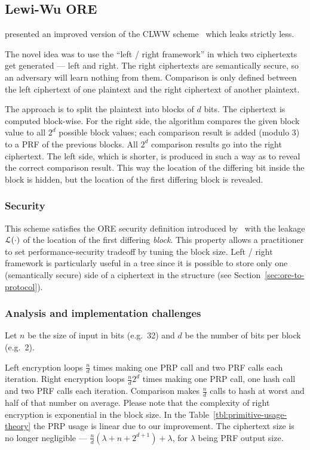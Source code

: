 \subsection{Lewi-Wu ORE}

	\textcite{lewi-wu-ore} presented an improved version of the CLWW scheme~\cite{clww-ore} which leaks strictly less.

	The novel idea was to use the ``left / right framework'' in which two ciphertexts get generated --- left and right.
	The right ciphertexts are semantically secure, so an adversary will learn nothing from them.
	Comparison is only defined between the left ciphertext of one plaintext and the right ciphertext of another plaintext.

	The approach is to split the plaintext into blocks of $d$ bits.
	The ciphertext is computed block-wise.
	For the right side, the algorithm compares the given block value to all $2^d$ possible block values; each comparison result is added (modulo 3) to a PRF of the previous blocks.
	All $2^d$ comparison results go into the right ciphertext.
	The left side, which is shorter, is produced in such a way as to reveal the correct comparison result.
	This way the location of the differing bit inside the block is hidden, but the location of the first differing block is revealed.

	\subsubsection{Security}
		This scheme satisfies the ORE security definition introduced by~\textcite{clww-ore} with the leakage $\mathcal{L}(\cdot)$ of the location of the first differing \emph{block}.
		This property allows a practitioner to set performance-security tradeoff by tuning the block size.
		Left / right framework is particularly useful in a {\BPlus} tree since it is possible to store only one (semantically secure) side of a ciphertext in the structure (see Section~\ref{sec:ore-to-protocol}).

	\subsubsection{Analysis and implementation challenges}

		Let $n$ be the size of input in bits (e.g.\ 32) and $d$ be the number of bits per block (e.g.\ 2).

		Left encryption loops $\frac{n}{d}$ times making one PRP call and two PRF calls each iteration.
		Right encryption loops $\frac{n}{d} 2^d$ times making one PRP call, one hash call and two PRF calls each iteration.
		Comparison makes $\frac{n}{d}$ calls to hash at worst and half of that number on average.
		Please note that the complexity of right encryption is exponential in the block size.
		In the Table~\ref{tbl:primitive-usage-theory} the PRP usage is linear due to our improvement.
		The ciphertext size is no longer negligible --- $\frac{n}{d} \left(\lambda + n + 2^{d + 1} \right) + \lambda$, for $\lambda$ being PRF output size.

